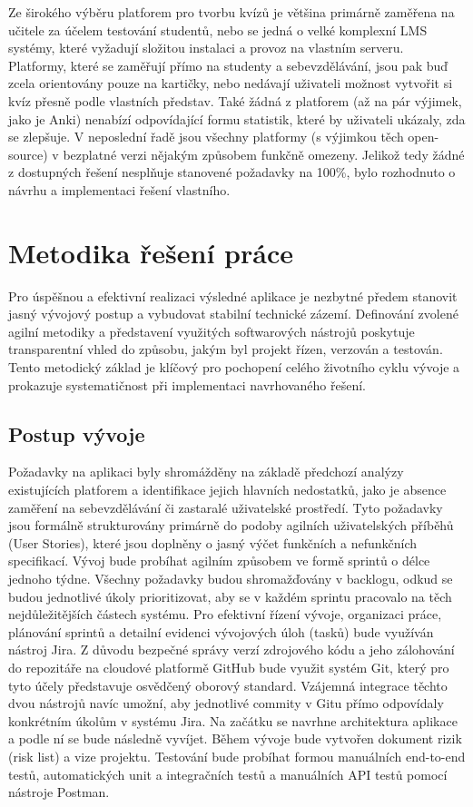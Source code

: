 \documentclass{vskpou} %
\begin{document}
Ze širokého výběru platforem pro tvorbu kvízů je většina primárně zaměřena na učitele za účelem testování studentů, nebo se jedná o velké komplexní LMS systémy, které vyžadují složitou instalaci a provoz na vlastním serveru. Platformy, které se zaměřují přímo na studenty a sebevzdělávání, jsou pak buď zcela orientovány pouze na kartičky, nebo nedávají uživateli možnost vytvořit si kvíz přesně podle vlastních představ. Také žádná z platforem (až na pár výjimek, jako je Anki) nenabízí odpovídající formu statistik, které by uživateli ukázaly, zda se zlepšuje. V neposlední řadě jsou všechny platformy (s výjimkou těch open-source) v bezplatné verzi nějakým způsobem funkčně omezeny. Jelikož tedy žádné z dostupných řešení nesplňuje stanovené požadavky na 100\%, bylo rozhodnuto o návrhu a implementaci řešení vlastního.

\section{Metodika řešení práce}

Pro úspěšnou a efektivní realizaci výsledné aplikace je nezbytné předem stanovit jasný vývojový postup a vybudovat stabilní technické zázemí. Definování zvolené agilní metodiky a představení využitých softwarových nástrojů poskytuje transparentní vhled do způsobu, jakým byl projekt řízen, verzován a testován. Tento metodický základ je klíčový pro pochopení celého životního cyklu vývoje a prokazuje systematičnost při implementaci navrhovaného řešení.

\subsection{Postup vývoje}

Požadavky na aplikaci byly shromážděny na základě předchozí analýzy existujících platforem a identifikace jejich hlavních nedostatků, jako je absence zaměření na sebevzdělávání či zastaralé uživatelské prostředí. Tyto požadavky jsou formálně strukturovány primárně do podoby agilních uživatelských příběhů (User Stories), které jsou doplněny o jasný výčet funkčních a nefunkčních specifikací.
Vývoj bude probíhat agilním způsobem ve formě sprintů o délce jednoho týdne. Všechny požadavky budou shromažďovány v backlogu, odkud se budou jednotlivé úkoly prioritizovat, aby se v každém sprintu pracovalo na těch nejdůležitějších částech systému. Pro efektivní řízení vývoje, organizaci práce, plánování sprintů a detailní evidenci vývojových úloh (tasků) bude využíván nástroj Jira. Z důvodu bezpečné správy verzí zdrojového kódu a jeho zálohování do repozitáře na cloudové platformě GitHub bude využit systém Git, který pro tyto účely představuje osvědčený oborový standard. Vzájemná integrace těchto dvou nástrojů navíc umožní, aby jednotlivé commity v Gitu přímo odpovídaly konkrétním úkolům v systému Jira.
Na začátku se navrhne architektura aplikace a podle ní se bude následně vyvíjet. Během vývoje bude vytvořen dokument rizik (risk list) a vize projektu. Testování bude probíhat formou manuálních end-to-end testů, automatických unit a integračních testů a manuálních API testů pomocí nástroje Postman.
\end{document}
